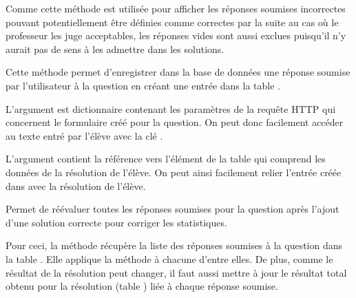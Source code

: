 \documentclass[a4,10pt,french]{sphinxmanual}
\begin{document}
\begin{fulllineitems}
\begin{fulllineitems}
Comme cette méthode est utilisée pour afficher les réponses soumises incorrectes pouvant
potentiellement être définies comme correctes par la suite au cas où le 
professeur les juge acceptables, les réponses vides sont aussi exclues 
puisqu'il n'y aurait pas de sens à les admettre dans les solutions.

\end{fulllineitems}


\begin{fulllineitems}
\label{source:quiz.models.SimpleQuestion.save_submit}
Cette méthode permet d'enregistrer dans la base de données une réponse soumise
par l'utilisateur à la question  en créant une entrée dans la table
.

L'argument  est dictionnaire contenant les paramètres de la 
requête HTTP qui concernent le formulaire créé pour la question. On peut donc
facilement accéder au texte entré par l'élève avec la clé .

L'argument  contient la référence vers l'élément de la table
 qui comprend les données de la résolution de l'élève. On
peut ainsi facilement relier l'entrée créée dans  avec la résolution
de l'élève.

\end{fulllineitems}


\begin{fulllineitems}
\label{source:quiz.models.SimpleQuestion.update_question_results}
Permet de réévaluer toutes les réponses soumises pour la question après
l'ajout d'une solution correcte pour corriger les statistiques.

Pour ceci, la méthode récupère la liste des réponses soumises à la question
dans la table . Elle applique la méthode  à 
chacune d'entre elles. De plus,
comme le résultat de la résolution peut changer, il faut aussi mettre à jour
le résultat total obtenu pour la résolution (table ) liée à chaque réponse soumise.

\end{fulllineitems}


\end{fulllineitems}
\end{document}
